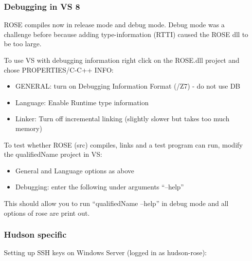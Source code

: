 \subsubsection{Debugging in VS 8}

ROSE compiles now in release mode and debug mode. Debug mode was a challenge before because adding type-information (RTTI) caused the ROSE dll to be too large. 

To use VS with debugging information right click on the ROSE.dll project and chose PROPERTIES/C-C++ INFO:

\begin{itemize}
    \item GENERAL: turn on Debugging Information Format (/Z7) - do not use DB
    \item Language: Enable Runtime type information
    \item Linker: Turn off incremental linking (slightly slower but takes too much memory) 
\end{itemize}


To test whether ROSE (src) compiles, links and a test program can run, modify the qualifiedName project in VS:
\begin{itemize}
    \item General and Language options as above
    \item Debugging: enter the following under arguments ``--help'' 
\end{itemize}

This should allow you to run ``qualifiedName --help'' in debug mode and all options of rose are print out. 




\subsubsection{Hudson specific}

Setting up SSH keys on Windows Server (logged in as hudson-rose):

